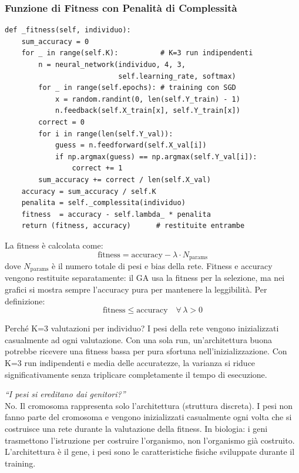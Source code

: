 \documentclass[12pt, a4paper]{article}
\begin{document}
\subsubsection{Funzione di Fitness con Penalità di Complessità}

\begin{lstlisting}[caption={Funzione di fitness}]
def _fitness(self, individuo):
    sum_accuracy = 0
    for _ in range(self.K):          # K=3 run indipendenti
        n = neural_network(individuo, 4, 3,
                           self.learning_rate, softmax)
        for _ in range(self.epochs): # training con SGD
            x = random.randint(0, len(self.Y_train) - 1)
            n.feedback(self.X_train[x], self.Y_train[x])
        correct = 0
        for i in range(len(self.Y_val)):
            guess = n.feedforward(self.X_val[i])
            if np.argmax(guess) == np.argmax(self.Y_val[i]):
                correct += 1
        sum_accuracy += correct / len(self.X_val)
    accuracy = sum_accuracy / self.K
    penalita = self._complessita(individuo)
    fitness  = accuracy - self.lambda_ * penalita
    return (fitness, accuracy)      # restituite entrambe
\end{lstlisting}

La fitness è calcolata come:
\begin{equation}
    \text{fitness} = \text{accuracy} - \lambda \cdot N_{\text{params}}
\end{equation}
dove $N_{\text{params}}$ è il numero totale di pesi e bias della rete. Fitness
e accuracy vengono restituite separatamente: il GA usa la fitness per la
selezione, ma nei grafici si mostra sempre l'accuracy pura per mantenere la
leggibilità. Per definizione:
\begin{equation}
    \text{fitness} \leq \text{accuracy} \quad \forall\, \lambda > 0
\end{equation}

\begin{concetto}{Perché K=3 valutazioni per individuo?}
I pesi della rete vengono inizializzati casualmente ad ogni valutazione.
Con una sola run, un'architettura buona potrebbe ricevere una fitness bassa
per pura sfortuna nell'inizializzazione. Con K=3 run indipendenti e media
delle accuratezze, la varianza si riduce significativamente senza triplicare
completamente il tempo di esecuzione.
\end{concetto}

\begin{domanda}
\textit{``I pesi si ereditano dai genitori?''}\\
No. Il cromosoma rappresenta solo l'architettura (struttura discreta).
I pesi non fanno parte del cromosoma e vengono inizializzati casualmente
ogni volta che si costruisce una rete durante la valutazione della fitness.
In biologia: i geni trasmettono l'istruzione per costruire l'organismo,
non l'organismo già costruito. L'architettura è il gene, i pesi sono
le caratteristiche fisiche sviluppate durante il training.
\end{domanda}
\end{document}
